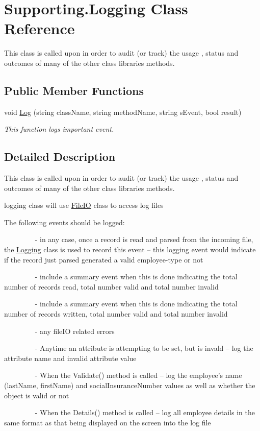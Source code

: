 \hypertarget{class_supporting_1_1_logging}{\section{Supporting.\-Logging Class Reference}
\label{class_supporting_1_1_logging}
}


This class is called upon in order to audit (or track) the usage , status and outcomes of many of the other class libraries methods.  


\subsection*{Public Member Functions}
\begin{DoxyCompactItemize}
\item 
void \hyperlink{class_supporting_1_1_logging_adc9a7adf68b3b6bba99ea10df6cc5835}{Log} (string class\-Name, string method\-Name, string s\-Event, bool result)
\begin{DoxyCompactList}\small\item\em This function logs important event. \end{DoxyCompactList}\end{DoxyCompactItemize}


\subsection{Detailed Description}
This class is called upon in order to audit (or track) the usage , status and outcomes of many of the other class libraries methods. 

logging class will use \hyperlink{class_supporting_1_1_file_i_o}{File\-I\-O} class to access log files \par
 The following events should be logged\-: \par
         -\/ in any case, once a record is read and parsed from the incoming file, the \hyperlink{class_supporting_1_1_logging}{Logging} class is used to record this event – this logging event would indicate if the record just parsed generated a valid employee-\/type or not \par
         -\/ include a summary event when this is done indicating the total number of records read, total number valid and total number invalid \par
         -\/ include a summary event when this is done indicating the total number of records written, total number valid and total number invalid \par
         -\/ any file\-I\-O related errors \par
         -\/ Anytime an attribute is attempting to be set, but is invald – log the attribute name and invalid attribute value \par
         -\/ When the Validate() method is called – log the employee’s name (last\-Name, first\-Name) and social\-Insurance\-Number values as well as whether the object is valid or not \par
         -\/ When the Details() method is called – log all employee details in the same format as that being displayed on the screen into the log file \par



